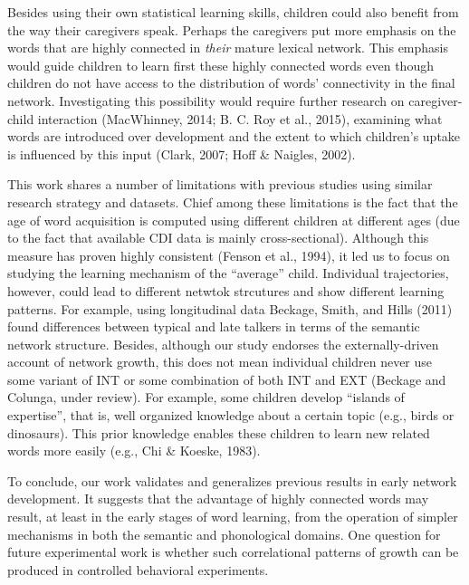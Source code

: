 \documentclass[english,floatsintext,man]{apa6}
\theoremstyle{definition}
\theoremstyle{definition}
\theoremstyle{definition}
\theoremstyle{remark}
\begin{document}
Besides using their own statistical learning skills, children could also
benefit from the way their caregivers speak. Perhaps the caregivers put
more emphasis on the words that are highly connected in \emph{their}
mature lexical network. This emphasis would guide children to learn
first these highly connected words even though children do not have
access to the distribution of words' connectivity in the final network.
Investigating this possibility would require further research on
caregiver-child interaction (MacWhinney, 2014; B. C. Roy et al., 2015),
examining what words are introduced over development and the extent to
which children's uptake is influenced by this input (Clark, 2007; Hoff
\& Naigles, 2002).

This work shares a number of limitations with previous studies using
similar research strategy and datasets. Chief among these limitations is
the fact that the age of word acquisition is computed using different
children at different ages (due to the fact that available CDI data is
mainly cross-sectional). Although this measure has proven highly
consistent (Fenson et al., 1994), it led us to focus on studying the
learning mechanism of the \enquote{average} child. Individual
trajectories, however, could lead to different netwtok strcutures and
show different learning patterns. For example, using longitudinal data
Beckage, Smith, and Hills (2011) found differences between typical and
late talkers in terms of the semantic network structure. Besides,
although our study endorses the externally-driven account of network
growth, this does not mean individual children never use some variant of
INT or some combination of both INT and EXT (Beckage and Colunga, under
review). For example, some children develop \enquote{islands of
expertise}, that is, well organized knowledge about a certain topic
(e.g., birds or dinosaurs). This prior knowledge enables these children
to learn new related words more easily (e.g., Chi \& Koeske, 1983).

To conclude, our work validates and generalizes previous results in
early network development. It suggests that the advantage of highly
connected words may result, at least in the early stages of word
learning, from the operation of simpler mechanisms in both the semantic
and phonological domains. One question for future experimental work is
whether such correlational patterns of growth can be produced in
controlled behavioral experiments.

\vspace{1em}
\end{document}
